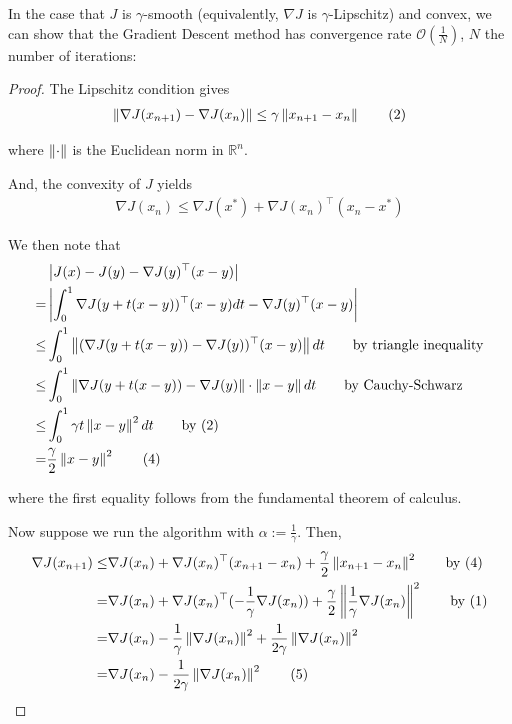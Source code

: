 In the case that 
$J$ is $\gamma$-smooth (equivalently, $\nabla J$ is $\gamma$-Lipschitz) and convex, we can show that the Gradient Descent method has convergence rate $\mathcal{O}(\frac{1}{N})$, $N$ the number of 
iterations:
\begin{proof}
The Lipschitz condition gives
\begin{align*}
    \left\lVert\nabla J(x_{n+1}) - \nabla J(x_n)\right\rVert \leq 
    \gamma \left\lVert x_{n+1}-{x_n}\right\rVert
    \tag{2}
\end{align*} 

where $\left\lVert\cdot\right\rVert$ is the Euclidean norm in $\mathbb{R}^n$.

And, the convexity of $J$ yields
\begin{align*}
    \nabla J(x_{n}) \leq 
    \nabla J(x^*) + \nabla J(x_{n})^\top (x_n-x^*)
    \tag{3}
\end{align*} 

We then note that
\begin{align*}
    &\left\lvert J(x) - J(y) - \nabla J(y)^\top (x-y)\right\rvert
    \\
    = &\left\lvert
    \int_{0}^{1} \nabla J(y + t(x-y))^\top (x-y)dt 
    - \nabla J(y)^\top (x-y)
    \right\rvert
    \\
    \leq &\int_{0}^{1}\left\lVert(\nabla J(y + t(x-y)) - \nabla J(y))^\top (x-y)\right\rVert dt
    \tag*{by triangle inequality}
    \\
    \leq &\int_{0}^{1}\left\lVert\nabla J(y + t(x-y)) - \nabla J(y)\right\rVert \cdot \left\lVert x-y\right\rVert dt
    \tag*{by Cauchy-Schwarz}
    \\
    \leq &\int_{0}^{1} \gamma t \left\lVert x-y\right\rVert^2dt
    \tag*{by (2)}
    \\
    = &\frac{\gamma}{2}\left\lVert x-y\right\rVert^2
    \tag{4}
\end{align*}   

where the first equality follows from the fundamental theorem of calculus.

Now suppose we run the algorithm with $\alpha := \frac{1}{\gamma}$. Then,
\begin{align*}
    \nabla J(x_{n+1}) \leq 
    & \nabla J(x_n) + \nabla J(x_n)^\top (x_{n+1}-x_n) + \frac{\gamma}{2} \left\lVert x_{n+1}-x_n\right\rVert^2
    \tag*{by (4)}
    \\
    = & \nabla J(x_n) + \nabla J(x_n)^\top (-\frac{1}{\gamma}\nabla J(x_n)) + \frac{\gamma}{2} \left\lVert\frac{1}{\gamma}\nabla J(x_n)\right\rVert^2
    \tag*{by (1)}
    \\
    = & \nabla J(x_n) - \frac{1}{\gamma} \left\lVert\nabla J(x_n)\right\rVert^2 + \frac{1}{2 \gamma} \left\lVert\nabla J(x_n)\right\rVert^2
    \\
    = & \nabla J(x_n) - \frac{1}{2 \gamma} \left\lVert\nabla J(x_n)\right\rVert^2 
    \tag{5}
\end{align*}


\end{proof}
